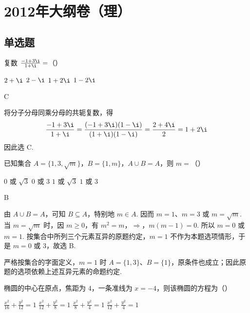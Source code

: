 \chapter{2012年大纲卷（理）}

\section{单选题}

\begin{problem}
复数 \(\frac{-1 + 3\i}{1 + \i} =\)（\quad）

\choices
    {\(2 + \i\)}
    {\(2 - \i\)}
    {\(1 + 2\i\)}
    {\(1 - 2\i\)}
\end{problem}

\begin{answer}
C
\end{answer}

\begin{solution}
将分子分母同乘分母的共轭复数，得
\[
\frac{-1+3\i}{1+\i}=\frac{(-1+3\i)(1-\i)}{(1+\i)(1-\i)}
=\frac{2+4\i}{2}=1+2\i
\]
因此选 C.
\end{solution}

\begin{problem}
已知集合 \(A = \{1, 3, \sqrt{m}\}\)，\(B = \{1, m\}\)，\(A \cup B = A\)，则 \(m =\)（\quad）

\choices
    {\(0\) 或 \(\sqrt{3}\)}
    {\(0\) 或 \(3\)}
    {\(1\) 或 \(\sqrt{3}\)}
    {\(1\) 或 \(3\)}
\end{problem}

\begin{answer}
B
\end{answer}

\begin{solution}
由 \(A\cup B=A\)，可知 \(B\subseteq A\)，特别地 \(m\in A\). 因而 \(m=1\)、\(m=3\) 或 \(m=\sqrt m\).
当 \(m=\sqrt m\) 时，因 \(m\geqslant0\)，有
\(m^2=m\)，\(\Longrightarrow\)，\(m(m-1)=0\).
所以 \(m=0\) 或 \(m=1\). 按集合中所列三个元素互异的原题约定，\(m=1\) 不作为本题选项情形，于是 \(m=0\) 或 \(3\)，故选 B.

严格按集合的字面定义，\(m=1\) 时 \(A=\{1,3\}\)、\(B=\{1\}\)，原条件也成立；因此原题的选项依赖上述互异元素的命题约定.
\end{solution}

\begin{problem}
椭圆的中心在原点，焦距为 \(4\)，一条准线为 \(x = -4\)，则该椭圆的方程为（\quad）

\choices
    {\(\frac{x^2}{16} + \frac{y^2}{12} = 1\)}
    {\(\frac{x^2}{12} + \frac{y^2}{8} = 1\)}
    {\(\frac{x^2}{8} + \frac{y^2}{4} = 1\)}
    {\(\frac{x^2}{12} + \frac{y^2}{4} = 1\)}
\end{problem}


